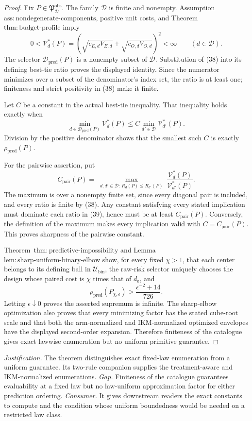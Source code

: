 \documentclass{article}
\begin{document}
\begin{proof}
Fix \(P\in\mathfrak P_{\mathcal D}^{\mathrm{obs}}\).  The family \(\mathcal D\) is finite and nonempty.  Assumption~\(\mathrm{ass{:}nondegenerate\text{-}components}\), positive unit costs, and Theorem~\(\mathrm{thm{:}budget\text{-}profile}\) imply
\[
 0<\mathcal V_d^*(P)
 =\left(\sqrt{c_{E,d}V_{E,d}}+
 \sqrt{c_{O,d}V_{O,d}}\right)^2<\infty
 \qquad(d\in\mathcal D).                                \tag{38}
\]
The selector \(\mathcal D_{\mathrm{pred}}(P)\) is a nonempty subset of \(\mathcal D\).  Substitution of (38) into its defining best-tie ratio proves the displayed identity.  Since the numerator minimizes over a subset of the denominator's index set, the ratio is at least one; finiteness and strict positivity in (38) make it finite.

Let \(C\) be a constant in the actual best-tie inequality.  That inequality holds exactly when
\[
 \min_{d\in\mathcal D_{\mathrm{pred}}(P)}\mathcal V_d^*(P)
 \le C\min_{d'\in\mathcal D}\mathcal V_{d'}^*(P).
\]
Division by the positive denominator shows that the smallest such \(C\) is exactly \(\rho_{\mathrm{pred}}(P)\).

For the pairwise assertion, put
\[
 C_{\mathrm{pair}}(P)=
 \max_{\substack{d,d'\in\mathcal D:\,
 R_d(P)\le R_{d'}(P)}}
 \frac{\mathcal V_d^*(P)}{\mathcal V_{d'}^*(P)}.          \tag{39}
\]
The maximum is over a nonempty finite set, since every diagonal pair is included, and every ratio is finite by (38).  Any constant satisfying every stated implication must dominate each ratio in (39), hence must be at least \(C_{\mathrm{pair}}(P)\).  Conversely, the definition of the maximum makes every implication valid with \(C=C_{\mathrm{pair}}(P)\).  This proves sharpness of the pairwise constant.

Theorem~\(\mathrm{thm{:}predictive\text{-}impossibility}\) and Lemma~\(\mathrm{lem{:}sharp\text{-}uniform\text{-}binary\text{-}elbow}\) show, for every fixed \(\chi>1\), that each center belongs to its defining ball in \(\mathcal U_{\mathrm{bin}}\), the raw-risk selector uniquely chooses the design whose paired cost is \(\chi\) times that of \(d_{\mathrm e}\), and
\[
 \rho_{\mathrm{pred}}(P_{\chi,\epsilon})
 >\frac{\epsilon^{-2}+14}{726}.
\]
Letting \(\epsilon\downarrow0\) proves the asserted supremum is infinite.  The sharp-elbow optimization also proves that every minimizing factor has the stated cube-root scale and that both the arm-normalized and IKM-normalized optimized envelopes have the displayed second-order expansion.  Therefore finiteness of the catalogue gives exact lawwise enumeration but no uniform primitive guarantee.
\end{proof}
\par\smallskip\noindent \textit{Justification.} The theorem distinguishes exact fixed-law enumeration from a uniform guarantee. Its two-rule companion supplies the treatment-aware and IKM-normalized enumerations. \textit{Gap.} Finiteness of the catalogue guarantees evaluability at a fixed law but no law-uniform approximation factor for either prediction ordering. \textit{Consumer.} It gives downstream readers the exact constants to compute and the condition whose uniform boundedness would be needed on a restricted law class.
\end{document}

